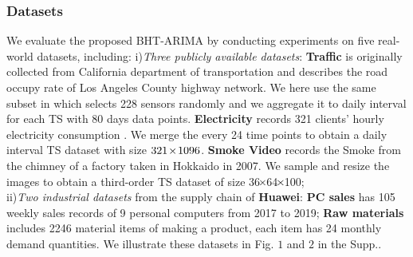 \documentclass[letterpaper]{article} %
\numberwithin{theorem}{section}
\begin{document}
\subsubsection{Datasets}
We  evaluate the proposed BHT-ARIMA by conducting  experiments on five real-world datasets, including: i)\textit{Three publicly available datasets}:
\textbf{Traffic}  is originally collected from California department of transportation   and describes the road occupy rate of Los Angeles County highway network. We here use the same subset  in  \cite{yu2017spatio} which selects 228 sensors randomly  and we aggregate it to daily interval  for each TS with  80 days data points.  
\textbf{Electricity}  records 321 clients' hourly electricity consumption \cite{lai2018modeling}. We merge the  every 24 time points to obtain  a daily interval TS dataset with size $321  \hspace{-0.05cm}\times \hspace{-0.05cm} 1096$.
\textbf{Smoke Video} records the Smoke  from the chimney of a factory taken in Hokkaido in 2007. We sample  and resize the images to obtain a  third-order TS dataset of size 36$  \hspace{-0.05cm}\times  \hspace{-0.05cm}$64$  \hspace{-0.05cm}\times  \hspace{-0.05cm}$100;  \\
ii)\textit{Two industrial datasets} from the supply chain  of   \textbf{Huawei}:
\textbf{PC sales} has  105 weekly sales records of 9 personal computers from 2017 to  2019; \textbf{Raw materials} includes  2246  material  items of   making a product, each item has 24 monthly demand quantities. 
We illustrate these datasets in Fig. $1$  and  $2$ in the {Supp..}
\end{document}
